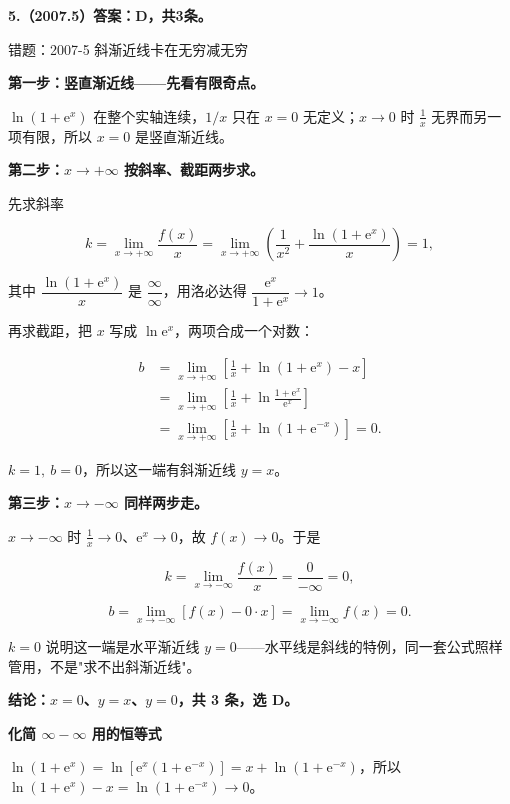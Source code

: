 \documentclass[UTF8,11pt,fontset=windows]{ctexart}
\begin{document}
\clearpage

\textbf{5.（2007.5）答案：D，共3条。}

\begingroup\color{gray}错题：2007-5 斜渐近线卡在无穷减无穷\par\endgroup

\textbf{第一步：竖直渐近线——先看有限奇点。}

$\ln(1+\mathrm e^x)$ 在整个实轴连续，$1/x$ 只在 $x=0$ 无定义；$x\to0$ 时 $\frac1x$ 无界而另一项有限，所以 $x=0$ 是竖直渐近线。

\textbf{第二步：$x\to+\infty$ 按斜率、截距两步求。}

先求斜率

$$
k=\lim_{x\to+\infty}\frac{f(x)}x
=\lim_{x\to+\infty}\left(\frac1{x^2}+\frac{\ln(1+\mathrm e^x)}x\right)
=1,
$$

其中 $\dfrac{\ln(1+\mathrm e^x)}x$ 是 $\dfrac\infty\infty$，用洛必达得 $\dfrac{\mathrm e^x}{1+\mathrm e^x}\to1$。

再求截距，把 $x$ 写成 $\ln \mathrm e^x$，两项合成一个对数：

$$
\begin{aligned}
b&=\lim_{x\to+\infty}\left[\frac1x+\ln(1+\mathrm e^x)-x\right]\\
&=\lim_{x\to+\infty}\left[\frac1x+\ln\frac{1+\mathrm e^x}{\mathrm e^x}\right]\\
&=\lim_{x\to+\infty}\left[\frac1x+\ln(1+\mathrm e^{-x})\right]=0.
\end{aligned}
$$

$k=1,\ b=0$，所以这一端有斜渐近线 $y=x$。

\textbf{第三步：$x\to-\infty$ 同样两步走。}

$x\to-\infty$ 时 $\frac1x\to0$、$\mathrm e^x\to0$，故 $f(x)\to0$。于是

$$
k=\lim_{x\to-\infty}\frac{f(x)}x=\frac{0}{-\infty}=0,
$$

$$
b=\lim_{x\to-\infty}\left[f(x)-0\cdot x\right]=\lim_{x\to-\infty}f(x)=0.
$$

$k=0$ 说明这一端是水平渐近线 $y=0$——水平线是斜线的特例，同一套公式照样管用，不是"求不出斜渐近线"。

\textbf{结论：$x=0$、$y=x$、$y=0$，共 3 条，选 D。}

{\bfseries 化简 $\infty-\infty$ 用的恒等式\par}
$\ln(1+\mathrm e^x)=\ln[\mathrm e^x(1+\mathrm e^{-x})]=x+\ln(1+\mathrm e^{-x})$，所以 $\ln(1+\mathrm e^x)-x=\ln(1+\mathrm e^{-x})\to0$。
\end{document}
